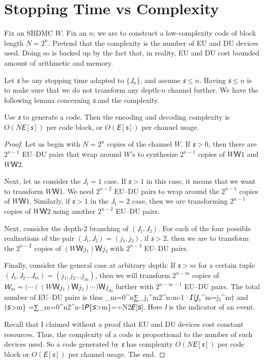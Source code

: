 \documentclass[openany]{amsbook}
\makeatletter
\numberwithin{equation}{chapter}
\numberwithin{figure}{chapter}
\numberwithin{table}{chapter}
\def\bigl@C#1{\bigl#1}					\def\bigr@C#1{\bigr#1}
\def\({\bigl@C(}	\def\){\bigr@C)}	令（{\Bigl(}			令）{\Bigr)}
\def\[#1\]{\begin{equation*}{#1}\end{equation*}}
\theoremstyle{definition}	理dfn:Definition~?s			理exa:Example~?s
\theoremstyle{remark}		理cla:Claim~?s				理rem:Remark~?s
\makeatother
\begin{document}
\section{Stopping Time vs Complexity}

	Fix an SBDMC $W$.
	Fix an $n$;
	we are to construct a low-complexity code of block length $N=2^n$.
	Pretend that the complexity is the number of EU and DU devices used.
	Doing so is backed up by the fact that, in reality,
	EU and DU cost bounded amount of arithmetic and memory.
	
	Let $𝘴$ be any stopping time adapted to $\{𝘑_n\}$, and assume $𝘴≤n$.
	Having $𝘴≤n$ is to make sure that we do not transform any depth-$n$ channel further.
	We have the following lemma concerning $𝘴$ and the complexity.
	
	\begin{lem}\label{lem:prune-C}
		Use $𝘴$ to generate a code.
		Then the encoding and decoding complexity is
		$O(N𝘌[𝘴])$ per code block, or $O(𝘌[𝘴])$ per channel usage.
	\end{lem}
	
	\begin{proof}
		Let us begin with $N=2^n$ copies of the channel $W$.
		If $𝘴>0$, then there are $2^{n-1}$ EU--DU pairs that
		wrap around $W$'s to synthesize $2^{n-1}$ copies of $WＷ1$ and $WＷ2$.
		
		Next, let us consider the $𝘑₁=1$ case.
		If $𝘴>1$ in this case, it means that we want to transform $WＷ1$.
		We need $2^{n-2}$ EU--DU pairs to wrap around the $2^{n-1}$ copies of $WＷ1$.
		Similarly, if $𝘴>1$ in the $𝘑₁=2$ case, then we are transforming
		$2^{n-1}$ copies of $WＷ2$ using another $2^{n-2}$ EU--DU pairs.
		
		Next, consider the depth-$2$ branching of $(𝘑₁,𝘑₂)$.
		For each of the four possible realizations of the pair $(𝘑₁,𝘑₂)=(j₁,j₂)$,
		if $𝘴>2$, then we are to transform the $2^{n-2}$ copies
		of $(WＷ{j₁})Ｗ{j₂}$ with $2^{n-3}$ EU--DU pairs.
		
		Finally, consider the general case at arbitrary depth:
		If $𝘴>m$ for a certain tuple $(𝘑₁,𝘑₂…𝘑_m)=(j₁,j₂…j_m)$,
		then we will transform $2^{n-m}$ copies of
		$𝘞_m=\(\dotsb((WＷ{j₁})Ｗ{j₂})\dotsb\)Ｗ{j_m}$
		further with $2^{n-m-1}$ EU--DU pairs.
		The total number of EU--DU pairs is thus
		\[∑_{m=0}^n∑_{j₁^m}2^{n-m-1}·𝘐\{𝘑₁^m=j₁^m† and †𝘴>m\}
			=∑_{m=0}^n2^{n-1}𝘗\{𝘴>m\}=÷N2𝘌[𝘴].\]
		Here $𝘐$ is the indicator of an event.
		
		Recall that I claimed without a proof that
		EU and DU devices cost constant resources.
		Thus, the complexity of a code is proportional
		to the number of such devices used.
		So a code generated by $𝘴$ has complexity
		$O(N𝘌[𝘴])$ per code block or $O(𝘌[𝘴])$ per channel usage.
		The end.
	\end{proof}
	
\end{document}
